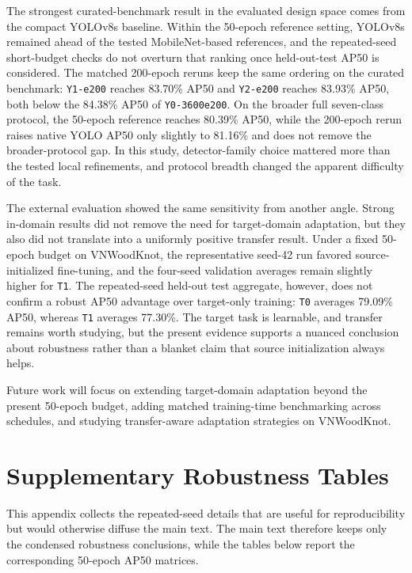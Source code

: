 \documentclass[10pt,a4paper]{article}
\begin{document}
The strongest curated-benchmark result in the evaluated design space comes from the compact YOLOv8s baseline. Within the 50-epoch reference setting, YOLOv8s remained ahead of the tested MobileNet-based references, and the repeated-seed short-budget checks do not overturn that ranking once held-out-test AP50 is considered. The matched 200-epoch reruns keep the same ordering on the curated benchmark: \texttt{Y1-e200} reaches 83.70\% AP50 and \texttt{Y2-e200} reaches 83.93\% AP50, both below the 84.38\% AP50 of \texttt{Y0-3600e200}. On the broader full seven-class protocol, the 50-epoch reference reaches 80.39\% AP50, while the 200-epoch rerun raises native YOLO AP50 only slightly to 81.16\% and does not remove the broader-protocol gap. In this study, detector-family choice mattered more than the tested local refinements, and protocol breadth changed the apparent difficulty of the task.

The external evaluation showed the same sensitivity from another angle. Strong in-domain results did not remove the need for target-domain adaptation, but they also did not translate into a uniformly positive transfer result. Under a fixed 50-epoch budget on VNWoodKnot, the representative seed-42 run favored source-initialized fine-tuning, and the four-seed validation averages remain slightly higher for \texttt{T1}. The repeated-seed held-out test aggregate, however, does not confirm a robust AP50 advantage over target-only training: \texttt{T0} averages 79.09\% AP50, whereas \texttt{T1} averages 77.30\%. The target task is learnable, and transfer remains worth studying, but the present evidence supports a nuanced conclusion about robustness rather than a blanket claim that source initialization always helps.

Future work will focus on extending target-domain adaptation beyond the present 50-epoch budget, adding matched training-time benchmarking across schedules, and studying transfer-aware adaptation strategies on VNWoodKnot.

\appendix
\section{Supplementary Robustness Tables}
\label{sec:appendix-robustness}

This appendix collects the repeated-seed details that are useful for reproducibility but would otherwise diffuse the main text. The main text therefore keeps only the condensed robustness conclusions, while the tables below report the corresponding 50-epoch AP50 matrices.
\end{document}
